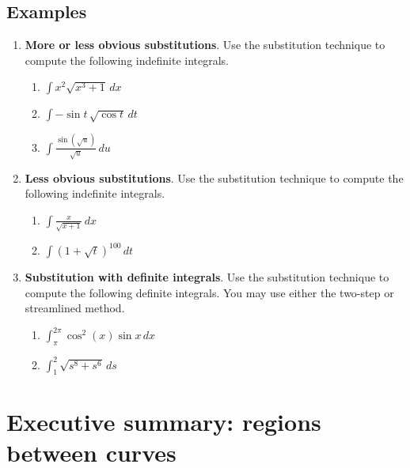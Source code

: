 \subsection*{Examples}
\begin{enumerate}
  \item {\bf More or less obvious substitutions}. Use the substitution technique to compute the following indefinite integrals.
  \begin{enumerate}
    \item $\displaystyle\int x^2\sqrt{x^3+1}\, dx$
    \item $\displaystyle\int -\sin t\, \sqrt{\cos t}\, dt$
    \item $\displaystyle\int \frac{\sin(\sqrt{u})}{\sqrt{u}}\, du$

  \end{enumerate}
  \item {\bf Less obvious substitutions}. Use the substitution technique to compute the following indefinite integrals.
  \begin{enumerate}
    \item $\displaystyle\int\frac{x}{\sqrt{x+1}}\, dx$
    \item $\displaystyle\int (1+\sqrt{t})^{100}\, dt$
  \end{enumerate}
\item {\bf Substitution with definite integrals}. Use the substitution technique to compute the following definite integrals. You may use either the two-step or streamlined method.
\begin{enumerate}
  \item $\displaystyle\int_{\pi}^{2\pi}\cos^2(x)\sin x\, dx$
  \item $\displaystyle\int_{1}^{2} \sqrt{s^8+s^6}\, ds$
\end{enumerate}
\end{enumerate}



\newpage

\section{Executive summary: regions between curves}

\thispagestyle{fancy}
